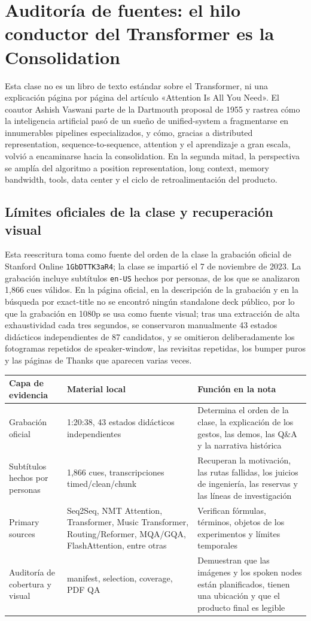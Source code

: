 \section{Auditoría de fuentes: el hilo conductor del Transformer es la Consolidation}

Esta clase no es un libro de texto estándar sobre el Transformer, ni una explicación página por página del artículo «Attention Is All You Need». El coautor Ashish Vaswani parte de la Dartmouth proposal de 1955 y rastrea cómo la inteligencia artificial pasó de un sueño de unified-system a fragmentarse en innumerables pipelines especializados, y cómo, gracias a distributed representation, sequence-to-sequence, attention y el aprendizaje a gran escala, volvió a encaminarse hacia la consolidation. En la segunda mitad, la perspectiva se amplía del algoritmo a position representation, long context, memory bandwidth, tools, data center y el ciclo de retroalimentación del producto.

\subsection{Límites oficiales de la clase y recuperación visual}

Esta reescritura toma como fuente del orden de la clase la grabación oficial de Stanford Online \texttt{1GbDTTK3aR4}; la clase se impartió el 7 de noviembre de 2023. La grabación incluye subtítulos \texttt{en-US} hechos por personas, de los que se analizaron 1,866 cues válidos. En la página oficial, en la descripción de la grabación y en la búsqueda por exact-title no se encontró ningún standalone deck público, por lo que la grabación en 1080p se usa como fuente visual; tras una extracción de alta exhaustividad cada tres segundos, se conservaron manualmente 43 estados didácticos independientes de 87 candidatos, y se omitieron deliberadamente los fotogramas repetidos de speaker-window, las revisitas repetidas, los bumper puros y las páginas de Thanks que aparecen varias veces.

\begin{longtable}{@{}L{0.18\textwidth}L{0.31\textwidth}L{0.40\textwidth}@{}}
\toprule
Capa de evidencia & Material local & Función en la nota \\
\midrule
Grabación oficial & 1:20:38, 43 estados didácticos independientes & Determina el orden de la clase, la explicación de los gestos, las demos, las Q\&A y la narrativa histórica \\
Subtítulos hechos por personas & 1,866 cues, transcripciones timed/clean/chunk & Recuperan la motivación, las rutas fallidas, los juicios de ingeniería, las reservas y las líneas de investigación \\
Primary sources & Seq2Seq, NMT Attention, Transformer, Music Transformer, Routing/Reformer, MQA/GQA, FlashAttention, entre otras & Verifican fórmulas, términos, objetos de los experimentos y límites temporales \\
Auditoría de cobertura y visual & manifest, selection, coverage, PDF QA & Demuestran que las imágenes y los spoken nodes están planificados, tienen una ubicación y que el producto final es legible \\
\bottomrule
\end{longtable}

